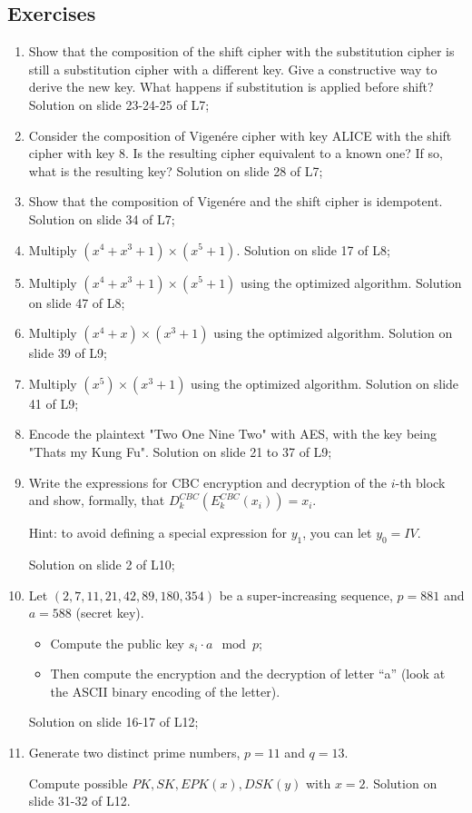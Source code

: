 \newpage
\subsection{Exercises}
\begin{enumerate}
    \item Show that the composition of the shift cipher with the substitution cipher is still a substitution cipher with a different key. Give a constructive way to derive the new key. What happens if substitution is applied before shift? Solution on slide 23-24-25 of L7;
    \item Consider the composition of Vigenére cipher with key ALICE with the shift cipher with key 8. Is the resulting cipher equivalent to a known one? If so, what is the resulting key? Solution on slide 28 of L7;
    \item Show that the composition of Vigenére and the shift cipher is idempotent. Solution on slide 34 of L7;
    \item Multiply $(x^4 + x^3 + 1) \times (x^5 + 1)$. Solution on slide 17 of L8;
    \item Multiply $(x^4 + x^3 + 1) \times (x^5 + 1)$ using the optimized algorithm. Solution on slide 47 of L8;
    \item Multiply $(x^4 + x) \times (x^3 + 1)$ using the optimized algorithm. Solution on slide 39 of L9;
    \item Multiply $(x^5) \times (x^3 + 1)$ using the optimized algorithm. Solution on slide 41 of L9;
    \item Encode the plaintext "Two One Nine Two" with AES, with the key being "Thats my Kung Fu". Solution on slide 21 to 37 of L9;
    \item Write the expressions for CBC encryption and decryption of the $i$-th block and show, formally, that $D^{CBC}_k(E^{CBC}_k(x_i)) = x_i$.
    
    Hint: to avoid defining a special expression for $y_1$, you can let $y_0 = IV$.

    Solution on slide 2 of L10;

    \item Let $(2, 7, 11, 21, 42, 89, 180, 354)$ be a super-increasing sequence, $p=881$ and $a=588$ (secret key). 
    
    \begin{itemize}
        \item Compute the public key $s_i \cdot a \mod p$;
        \item Then compute the encryption and the decryption of letter “a” (look at the ASCII binary encoding of the letter).
    \end{itemize}

    Solution on slide 16-17 of L12;

    \item Generate two distinct prime numbers, $p=11$ and $q=13$. 
    
    Compute possible $PK, SK, EPK(x), DSK(y)$ with $x=2$. Solution on slide 31-32 of L12.

\end{enumerate}
